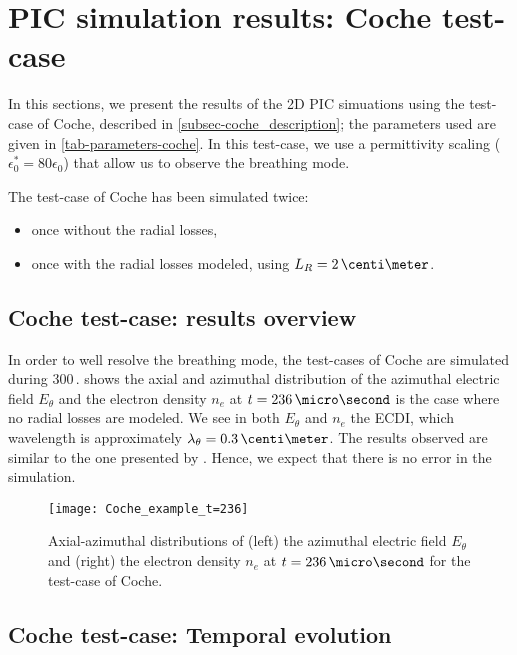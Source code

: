 
\section{PIC simulation results: Coche test-case}

In this sections, we present the results of the \ac{2D} \ac{PIC} simuations using the test-case of Coche, described in \cref{subsec-coche_description}; the parameters used are given in \vref{tab-parameters-coche}.
In this test-case, we use a permittivity scaling ($\epsilon_0^* = 80 \epsilon_0$) that allow us to observe the breathing mode.

The test-case of Coche has been simulated twice\string:
\begin{itemize}
  \item once without the radial losses, 
  \item once with the radial losses modeled, using $L_R = 2\,\centi\meter$.
\end{itemize}
 

\subsection{Coche test-case: results overview} \label{subsec-choche-overview}

In order to well resolve the breathing mode, the test-cases of Coche are simulated during 300\,\micro\second.
 shows the axial and azimuthal distribution of the azimuthal electric field $E_{\theta}$ and the electron density $n_e$ at $t=236\,\micro\second$ is the case where no radial losses are modeled.
We see in both $E_{\theta}$ and $n_e$ the \ac{ECDI}, which wavelength is approximately $\lambda_{\theta} = 0.3\,\centi\meter$.
The results observed are similar to the one presented by \citet{coche2014}.
Hence, we expect that there is no error in the simulation.

\begin{figure}[hbt]
  \centering
  \texttt{[image: Coche\_example\_t=236]}
  \caption{ Axial-azimuthal distributions of (left) the azimuthal electric field $E_{\theta}$ and (right) the electron density $n_e$ at $t=236\,\micro\second$ for the test-case of Coche. } 
  \label{fig-overview_coche_neEx}
\end{figure}



\subsection{Coche test-case: Temporal evolution} \label{subsec-temp_coche}

